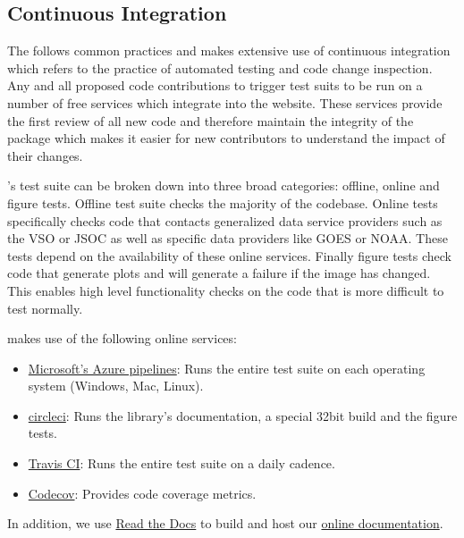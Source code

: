 \subsection{Continuous Integration}
The \sunpyproj follows common practices and makes extensive use of continuous integration
which refers to the practice of automated testing and code change inspection.
Any and all proposed code contributions to \sunpypkg trigger test suits to be run on a number of free services which integrate into the \github website.
These services provide the first review of all new code and therefore maintain the integrity of the package which makes it easier for new contributors to understand the impact of their changes.

\sunpypkg's test suite can be broken down into three broad categories: offline, online and figure tests.
Offline test suite checks the majority of the codebase.
Online tests specifically checks code that contacts generalized data service providers such as the VSO or JSOC as well as specific data providers like GOES or NOAA.
These tests depend on the availability of these online services.
Finally figure tests check code that generate plots and will generate a failure if the image has changed.
This enables high level functionality checks on the code that is more difficult to test normally.

\sunpy makes use of the following online services:

\begin{itemize}
\item \href{https://azure.microsoft.com/en-gb/services/devops/pipelines/}{Microsoft's Azure pipelines}: Runs the entire test suite on each operating system (Windows, Mac, Linux).
\item \href{https://circleci.com}{circleci}: Runs the library's documentation, a special 32bit build and the figure tests.
\item \href{https://travis-ci.org}{Travis CI}: Runs the entire test suite on a daily cadence.
\item \href{https://codecov.io/}{Codecov}: Provides code coverage metrics.
\end{itemize}

In addition, we use \href{https://readthedocs.org/}{Read the Docs} to build and host our \href{http://docs.sunpy.org/en/stable/}{online documentation}.
